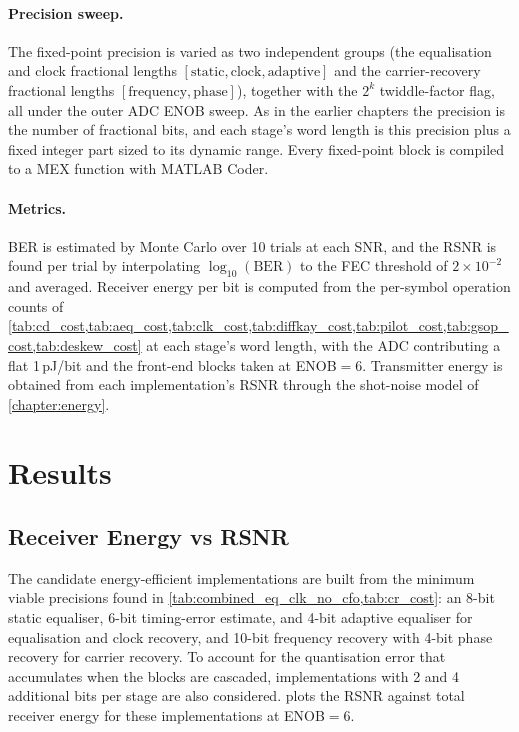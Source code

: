 \documentclass[12pt,a4paper]{report}
\begin{document}
\paragraph{Precision sweep.} The fixed-point precision is varied as two independent groups (the equalisation and clock fractional lengths $[\text{static}, \text{clock}, \text{adaptive}]$ and the carrier-recovery fractional lengths $[\text{frequency}, \text{phase}]$), together with the $2^k$ twiddle-factor flag, all under the outer ADC ENOB sweep. As in the earlier chapters the precision is the number of fractional bits, and each stage's word length is this precision plus a fixed integer part sized to its dynamic range. Every fixed-point block is compiled to a MEX function with MATLAB Coder.

\paragraph{Metrics.} BER is estimated by Monte Carlo over 10 trials at each SNR, and the RSNR is found per trial by interpolating $\log_{10}(\mathrm{BER})$ to the FEC threshold of $2\times10^{-2}$ and averaged. Receiver energy per bit is computed from the per-symbol operation counts of \cref{tab:cd_cost,tab:aeq_cost,tab:clk_cost,tab:diffkay_cost,tab:pilot_cost,tab:gsop_cost,tab:deskew_cost} at each stage's word length, with the ADC contributing a flat 1\,pJ/bit and the front-end blocks taken at ENOB$=6$. Transmitter energy is obtained from each implementation's RSNR through the shot-noise model of \cref{chapter:energy}.

\section{Results}
\subsection{Receiver Energy vs RSNR}
The candidate energy-efficient implementations are built from the minimum viable precisions found in \cref{tab:combined_eq_clk_no_cfo,tab:cr_cost}: an 8-bit static equaliser, 6-bit timing-error estimate, and 4-bit adaptive equaliser for equalisation and clock recovery, and 10-bit frequency recovery with 4-bit phase recovery for carrier recovery. To account for the quantisation error that accumulates when the blocks are cascaded, implementations with 2 and 4 additional bits per stage are also considered.  plots the RSNR against total receiver energy for these implementations at ENOB$=6$.
\end{document}
